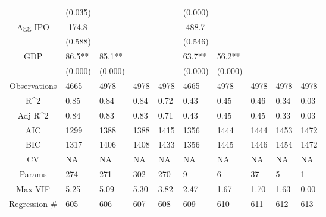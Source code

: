 \documentclass{article}
\begin{document}
\begin{table}[H]
\begin{tabular}{|clllllllll|}
   & (0.035) &  &  &  & (0.000) &  &  &  &  \\
  Agg IPO & -174.8 &  &  &  & -488.7 &  &  &  &  \\
   & (0.588) &  &  &  & (0.546) &  &  &  &  \\
  GDP & 86.5** & 85.1** &  &  & 63.7** & 56.2** &  &  &  \\
   & (0.000) & (0.000) &  &  & (0.000) & (0.000) &  &  &  \\
  \hline
 Observations & 4665 & 4978 & 4978 & 4978 & 4665 & 4978 & 4978 & 4978 & 4978 \\
  R^2 & 0.85 & 0.84 & 0.84 & 0.72 & 0.43 & 0.45 & 0.46 & 0.34 & 0.03 \\
  Adj R^2 & 0.84 & 0.83 & 0.83 & 0.71 & 0.43 & 0.45 & 0.45 & 0.33 & 0.03 \\
  AIC & 1299 & 1388 & 1388 & 1415 & 1356 & 1444 & 1444 & 1453 & 1472 \\
  BIC & 1317 & 1406 & 1408 & 1433 & 1356 & 1445 & 1446 & 1454 & 1472 \\
  CV & NA & NA & NA & NA & NA & NA & NA & NA & NA \\
  Params & 274 & 271 & 302 & 270 & 9 & 6 & 37 & 5 & 1 \\
  Max VIF & 5.25 & 5.09 & 5.30 & 3.82 & 2.47 & 1.67 & 1.70 & 1.63 & 0.00 \\
  Regression \# & 605 & 606 & 607 & 608 & 609 & 610 & 611 & 612 & 613 \\
   \hline
\end{tabular}

\end{table}
\end{document}
